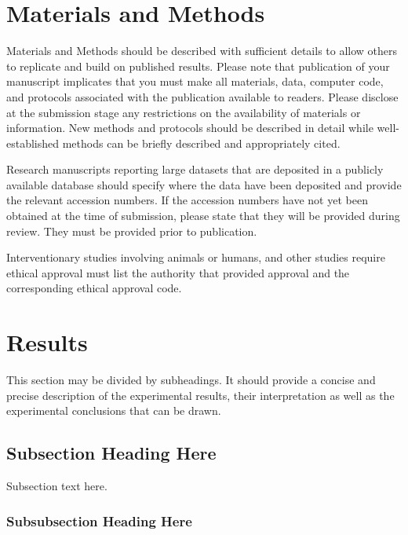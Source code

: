 \documentclass[
]{article}
\begin{document}
\hypertarget{materials-and-methods}{%
\section{Materials and Methods}\label{materials-and-methods}}

Materials and Methods should be described with sufficient details to allow
others to replicate and build on published results. Please note that publication
of your manuscript implicates that you must make all materials, data, computer
code, and protocols associated with the publication available to readers. Please
disclose at the submission stage any restrictions on the availability of
materials or information. New methods and protocols should be described in
detail while well-established methods can be briefly described and appropriately
cited.

Research manuscripts reporting large datasets that are deposited in a publicly
available database should specify where the data have been deposited and provide
the relevant accession numbers. If the accession numbers have not yet been
obtained at the time of submission, please state that they will be provided
during review. They must be provided prior to publication.

Interventionary studies involving animals or humans, and other studies require
ethical approval must list the authority that provided approval and the
corresponding ethical approval code.

\hypertarget{results-1}{%
\section{Results}\label{results-1}}

This section may be divided by subheadings. It should provide a concise and
precise description of the experimental results, their interpretation as well
as the experimental conclusions that can be drawn.

\hypertarget{subsection-heading-here}{%
\subsection{Subsection Heading Here}\label{subsection-heading-here}}

Subsection text here.

\hypertarget{subsubsection-heading-here}{%
\subsubsection{Subsubsection Heading Here}\label{subsubsection-heading-here}}
\end{document}
